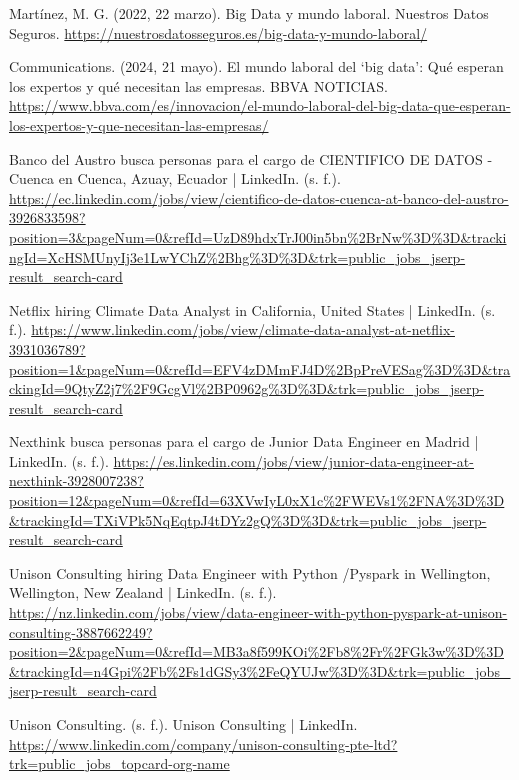 \documentclass[12pt]{article}
\begin{document}
    \newpage



    \begin{thebibliography}{99}

         Martínez, M. G. (2022, 22 marzo). Big Data y mundo laboral. Nuestros Datos Seguros. \url{https://nuestrosdatosseguros.es/big-data-y-mundo-laboral/}
        
         Communications. (2024, 21 mayo). El mundo laboral del ‘big data’: Qué esperan los expertos y qué necesitan las empresas. BBVA NOTICIAS. \url{https://www.bbva.com/es/innovacion/el-mundo-laboral-del-big-data-que-esperan-los-expertos-y-que-necesitan-las-empresas/}
        
         Banco del Austro busca personas para el cargo de CIENTIFICO DE DATOS - Cuenca en Cuenca, Azuay, Ecuador | LinkedIn. (s. f.). \url{https://ec.linkedin.com/jobs/view/cientifico-de-datos-cuenca-at-banco-del-austro-3926833598?position=3&pageNum=0&refId=UzD89hdxTrJ00in5bn%2BrNw%3D%3D&trackingId=XcHSMUnyIj3e1LwYChZ%2Bhg%3D%3D&trk=public_jobs_jserp-result_search-card}
        
         Netflix hiring Climate Data Analyst in California, United States | LinkedIn. (s. f.). \url{https://www.linkedin.com/jobs/view/climate-data-analyst-at-netflix-3931036789?position=1&pageNum=0&refId=EFV4zDMmFJ4D%2BpPreVESag%3D%3D&trackingId=9QtyZ2j7%2F9GcgVl%2BP0962g%3D%3D&trk=public_jobs_jserp-result_search-card}
        
         Nexthink busca personas para el cargo de Junior Data Engineer en Madrid | LinkedIn. (s. f.). \url{https://es.linkedin.com/jobs/view/junior-data-engineer-at-nexthink-3928007238?position=12&pageNum=0&refId=63XVwIyL0xX1c%2FWEVs1%2FNA%3D%3D&trackingId=TXiVPk5NqEqtpJ4tDYz2gQ%3D%3D&trk=public_jobs_jserp-result_search-card}
        
         Unison Consulting hiring Data Engineer with Python /Pyspark in Wellington, Wellington, New Zealand | LinkedIn. (s. f.). \url{https://nz.linkedin.com/jobs/view/data-engineer-with-python-pyspark-at-unison-consulting-3887662249?position=2&pageNum=0&refId=MB3a8f599KOi%2Fb8%2Fr%2FGk3w%3D%3D&trackingId=n4Gpi%2Fb%2Fs1dGSy3%2FeQYUJw%3D%3D&trk=public_jobs_jserp-result_search-card}
        
         Unison Consulting. (s. f.). Unison Consulting | LinkedIn. \url{https://www.linkedin.com/company/unison-consulting-pte-ltd?trk=public_jobs_topcard-org-name}
        

\end{thebibliography}
\end{document}
